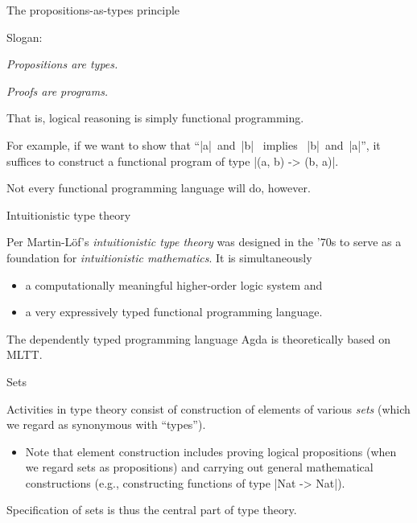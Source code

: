 \documentclass[t,compress,hyperref={hidelinks}]{beamer}
\renewcommand{\emph}[1]{\textit{\color{OxfordRed}#1}}
\begin{document}
\begin{frame}{The propositions-as-types principle}

Slogan:
\begin{center}
\emph{Propositions are types.}

\emph{Proofs are programs.}
\end{center}

That is, logical reasoning is simply functional programming.

For example, if we want to show that ``|a|~and~|b| ~implies~ |b|~and~|a|'', it suffices to construct a functional program of type |(a, b) -> (b, a)|.

Not every functional programming language will do, however.

\end{frame}

\begin{frame}{Intuitionistic type theory}

Per Martin-Löf's \emph{intuitionistic type theory} was designed in the '70s to serve as a foundation for \emph{intuitionistic mathematics}.
It is simultaneously
\begin{itemize}
\item a computationally meaningful higher-order logic system and
\item a very expressively typed functional programming language.
\end{itemize}

The dependently typed programming language Agda is theoretically based on MLTT.

\end{frame}

\begin{frame}{Sets}

Activities in type theory consist of construction of elements of various \emph{sets} (which we regard as synonymous with ``types'').
\begin{itemize}
\item Note that element construction includes proving logical propositions (when we regard sets as propositions) and carrying out general mathematical constructions (e.g., constructing functions of type |Nat -> Nat|).
\end{itemize}

Specification of sets is thus the central part of type theory.

\end{frame}
\end{document}
